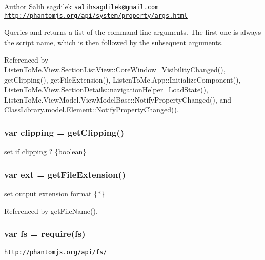 \begin{DoxyAuthor}{Author}
Salih sagdilek \href{mailto:salihsagdilek@gmail.com}{\tt salihsagdilek@gmail.\+com} \href{http://phantomjs.org/api/system/property/args.html}{\tt http\+://phantomjs.\+org/api/system/property/args.\+html}
\end{DoxyAuthor}
Queries and returns a list of the command-\/line arguments. The first one is always the script name, which is then followed by the subsequent arguments. 

Referenced by Listen\+To\+Me.\+View.\+Section\+List\+View\+::\+Core\+Window\+\_\+\+Visibility\+Changed(), get\+Clipping(), get\+File\+Extension(), Listen\+To\+Me.\+App\+::\+Initialize\+Component(), Listen\+To\+Me.\+View.\+Section\+Details\+::navigation\+Helper\+\_\+\+Load\+State(), Listen\+To\+Me.\+View\+Model.\+View\+Model\+Base\+::\+Notify\+Property\+Changed(), and Class\+Library.\+model.\+Element\+::\+Notify\+Property\+Changed().

\subsubsection[{\texorpdfstring{clipping}{clipping}}]{\setlength{\rightskip}{0pt plus 5cm}var clipping = {\bf get\+Clipping}()}\hypertarget{responsive-screenshot_8js_a2b6584f3e4fa2fd3eb22798214519b67}{}\label{responsive-screenshot_8js_a2b6584f3e4fa2fd3eb22798214519b67}
set if clipping ?  \{boolean\} 
\subsubsection[{\texorpdfstring{ext}{ext}}]{\setlength{\rightskip}{0pt plus 5cm}var ext = {\bf get\+File\+Extension}()}\hypertarget{responsive-screenshot_8js_af37ccdf7a718667b94d302bb07937162}{}\label{responsive-screenshot_8js_af37ccdf7a718667b94d302bb07937162}
set output extension format  \{$\ast$\} 

Referenced by get\+File\+Name().

\subsubsection[{\texorpdfstring{fs}{fs}}]{\setlength{\rightskip}{0pt plus 5cm}var fs = require(\textquotesingle{}fs\textquotesingle{})}\hypertarget{responsive-screenshot_8js_aebcdd70130f7e0b00b39cc981ab0bab0}{}\label{responsive-screenshot_8js_aebcdd70130f7e0b00b39cc981ab0bab0}
\href{http://phantomjs.org/api/fs/}{\tt http\+://phantomjs.\+org/api/fs/}

